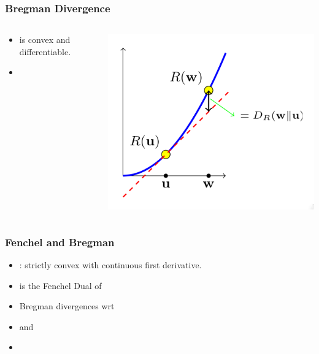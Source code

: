 \documentclass[handout]{beamer}
\begin{document}
\begin{small}
 \begin{frame}
    \frametitle{Bregman Divergence}
   \begin{columns}
     \begin{column}{0.55\textwidth}
       \begin{itemize}
       \item {} is convex and differentiable.
       \item {}
       \end{itemize}
     \end{column}
      \begin{column}{0.43\textwidth}
        \includegraphics[width=\textwidth]{figures/BregmanDivergence.png}
      \end{column}
    \end{columns}
  \end{frame}
 
\begin{frame}
  \frametitle{Fenchel and Bregman}
  \begin{itemize}
  \item
    : strictly convex with continuous first derivative.
  \item {} is the Fenchel Dual of 
  \item {} Bregman divergences wrt 
  \item {} and 
  \item {}
  \end{itemize}
\end{frame}


\end{small}
\end{document}

